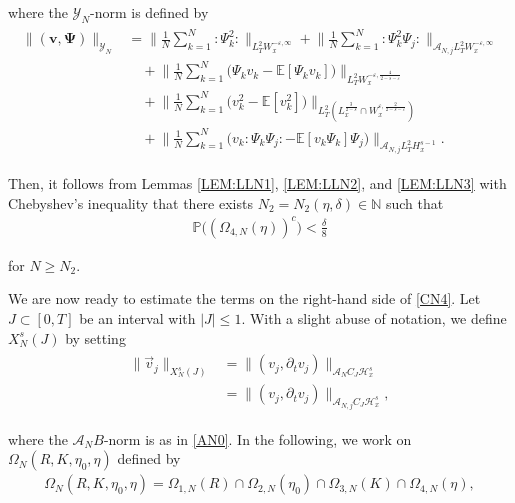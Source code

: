 \documentclass[letterpaper, 11pt,  reqno]{amsart}
\newcommand{\1}{\hspace{0.5mm}\text{I}\hspace{0.2mm}}
\newcommand{\noi}{\noindent}
\newcommand{\N}{\mathbb{N}}
\newcommand{\E}{\mathbb{E}}
\newcommand{\PP}{\mathbb{P}}
\renewcommand{\H}{\mathcal{H}}
\newcommand{\eps}{\varepsilon}
\newcommand{\dl}{\delta}
\newcommand{\dt}{\partial_t}
\newcommand{\A}{\mathcal{A}}
\newcommand{\Y}{\mathcal{Y}}
\newcommand{\wick}[1]{:\!{#1}\!:}
\newcommand{\vv}{\mathbf{v}}
\renewcommand{\O}{\Omega}
\numberwithin{equation}{section}
\numberwithin{theorem}{section}
\begin{document}
\noi
where the $\Y_N$-norm is defined by 
\begin{align}
\begin{split}
\|(\vv, \pmb \Psi) \|_{\Y_N} &  =  \bigg\| \frac{1}{N} \sum_{k = 1}^N 
\wick{\Psi_k^2} \bigg\|_{ L_T^2 W_x^{- \eps, \infty}}
+  \bigg\| \frac 1N \sum_{k = 1}^N 
\wick{\Psi_k^2 \Psi_j} \bigg\|_{ \A_{N, j}L_T^2 W_x^{- \eps, \infty}}\\
& \quad + \bigg\| \frac{1}{N} \sum_{k = 1}^N 
\Big( \Psi_k v_k - \E [\Psi_k v_k] \Big) \bigg\|_{L_T^2
W_x^{-\eps, \frac 4{2- s - \eps}}}\\
& \quad 
+ 
\bigg\| \frac{1}{N} \sum_{k = 1}^N
\Big( v_k^2 - \E [v_k^2] \Big) \bigg\|_{L_T^2 (L^\frac 3{2-s}_x
\cap W_x^{\eps, \frac 2{2-s-\eps}})} \\
& \quad
+ \bigg\| \frac 1N \sum_{k = 1}^N \Big( v_k \!\wick{\Psi_k \Psi_j} - \E [v_k\Psi_k ] \Psi_j \Big) 
\bigg\|_{\A_{N, j}L_T^2 H_x^{s-1}}.
 \end{split}
\label{BD8} 
\end{align}



\noi
Then, 
it follows from Lemmas \ref{LEM:LLN1}, 
 \ref{LEM:LLN2},  and \ref{LEM:LLN3}
 with Chebyshev's inequality
that there exists $N_2 = N_2(\eta, \dl) \in \N$ such that 
\begin{align}
\PP\big( (\O_{4, N}(\eta))^c \big) < \frac \dl 8
\label{BD9}
\end{align}

\noi
for $N \ge N_2$.


\medskip







We are now ready to estimate the terms on the right-hand side of \eqref{CN4}.
Let $J \subset [0, T]$ be an interval
with $|J| \le 1$.
With a slight abuse of notation, 
we define
 $X^s_N(J)$ by setting 
\begin{align}
\begin{split}
\|  \vec v_j\|_{X^s_N(J)}
& %
= 
\| ( v_j, \dt  v_j)\|_{\A_N C_J  \H^s_x}\\
& = 
\| ( v_{j}, \dt   v_{j})\|_{\A_{N, j} C_J  \H^s_x}, 
\end{split}
\label{CN5b}
\end{align}

\noi
where  the $\A_NB$-norm is as in \eqref{AN0}.
In the following, we work on 
$\O_N (R, K, \eta_0, \eta)$ defined by 
\begin{align}
\O_N  (R, K, \eta_0, \eta)= \O_{1, N}(R)
\cap \O_{2, N}(\eta_0)
 \cap \O_{3, N}(K) \cap \O_{4, N}(\eta), 
\label{BD10}
\end{align}
\end{document}
